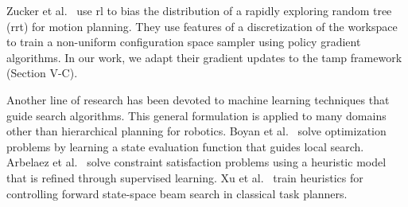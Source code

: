 Zucker et al.~\cite{workspacebias} use {\sc rl} to bias the distribution of a rapidly exploring random tree ({\sc rrt})
for motion planning. They use features of a discretization of the workspace to train
a non-uniform configuration space sampler using policy gradient algorithms.
In our work, we adapt their gradient updates to the {\sc tamp} framework (Section V-C).

Another line of research has been devoted to machine learning techniques that
guide search algorithms. This general formulation
is applied to many domains other than hierarchical planning for robotics.
Boyan et al.~\cite{Boyanlearning} solve optimization problems by learning a state
evaluation function that guides local search. Arbelaez et al.~\cite{hamadisearch} solve constraint
satisfaction problems using a heuristic model that is refined through supervised learning.
Xu et al.~\cite{Xu07discriminativelearning} train heuristics for controlling forward
state-space beam search in classical task planners.



